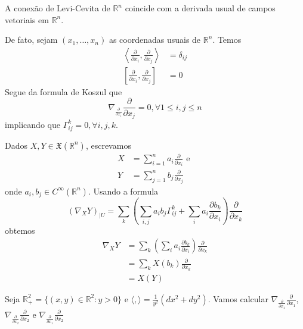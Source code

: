 \begin{observacao}
	A conexão de Levi-Cevita de $\mathbb{R}^n$ coincide com a derivada usual de campos vetoriais em $\mathbb{R}^n$.
	
	De fato, sejam $(x_1,\ldots,x_n)$ as coordenadas usuais de $\mathbb{R}^n$. Temos
	\begin{align*}
		\left\langle \frac{\partial}{\partial x_i},\frac{\partial}{\partial x_j}\right\rangle &= \delta_{ij}\\
		\left[\frac{\partial}{\partial x_i},\frac{\partial}{\partial x_j}\right] &= 0
	\end{align*}	
	Segue da formula de Koszul que
	\begin{equation*}
		\nabla_{\frac{\partial}{\partial x_i}} \frac{\partial}{\partial x_j} = 0, \forall 1 \leq i,j \leq n
	\end{equation*}	
	implicando que $\Gamma_{ij}^k = 0, \forall i,j,k$. 
	
	Dados $X,Y \in \mathfrak{X}(\mathbb{R}^n)$, escrevamos
	\begin{align*}
		X &= \sum_{i=1}^n a_i \frac{\partial}{\partial x_i} \text{ e }\\
		Y &= \sum_{j=1}^n b_j \frac{\partial}{\partial x_j}
	\end{align*}	
	onde $a_i,b_j \in C^{\infty}(\mathbb{R}^n)$. Usando a formula
	\begin{equation*}
		(\nabla_X Y)_{|U} = \sum_{k} \left(\sum_{i,j} a_i b_j \Gamma_{ij}^k + \sum_{i} a_i \frac{\partial b_k}{\partial x_i} \right) \frac{\partial}{\partial x_k}
	\end{equation*}	
	obtemos
	\begin{align*}
		\nabla_X Y &= \sum_{k} \left(\sum_{i} a_i \frac{\partial b_k}{\partial x_i} \right) \frac{\partial}{\partial x_k}\\
		&= \sum_{k} X(b_k) \frac{\partial}{\partial x_k}\\
		&= X(Y)
	\end{align*}
\end{observacao}

\begin{exemplo}
	Seja $\mathbb{R}_+^2 = \{(x,y) \in \mathbb{R}^2: y>0\}$ e $\langle,\rangle = \frac{1}{y^2} \left(dx^2+dy^2\right)$. Vamos calcular $\nabla_{\frac{\partial}{\partial x_1}} \frac{\partial}{\partial x_1}$, $\nabla_{\frac{\partial}{\partial x_2}} \frac{\partial}{\partial x_2}$ e $\nabla_{\frac{\partial}{\partial x_1}} \frac{\partial}{\partial x_2}$
\end{exemplo}


